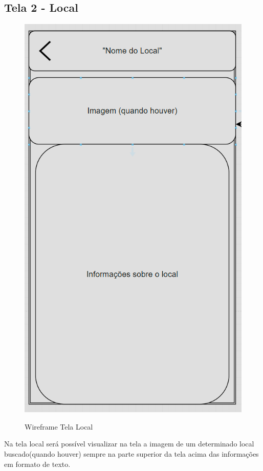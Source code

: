 \subsection{Tela 2 - Local}
\begin{figure}[H]
  \begin{center}
  \includegraphics[width=0.2\linewidth]{images/wire-tela-local.png}\\
  \end{center}
  \caption[Wireframe Tela Local]{Wireframe Tela Local}
  \label{fig:wireframe-tela-local}
\end{figure}
Na tela local será possível visualizar na tela a imagem de um determinado local buscado(quando houver) sempre na parte superior da tela acima das informações em formato de texto. 

